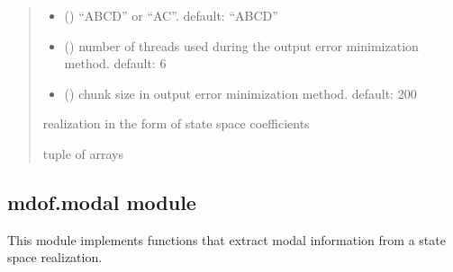 \documentclass[letterpaper,10pt,english]{sphinxmanual}
\begin{document}
\begin{fulllineitems}
\begin{quote}
\begin{description}
\begin{itemize}
\item {} 
\sphinxAtStartPar
{} (\sphinxstyleliteralemphasis{\sphinxupquote{, }}) \textendash{} “ABCD” or “AC”. default: “ABCD”

\item {} 
\sphinxAtStartPar
{} (\sphinxstyleliteralemphasis{\sphinxupquote{, }}) \textendash{} number of threads used during the output error minimization method.
default: 6

\item {} 
\sphinxAtStartPar
{} (\sphinxstyleliteralemphasis{\sphinxupquote{, }}) \textendash{} chunk size in output error minimization method. default: 200

\end{itemize}

\sphinxAtStartPar
realization in the form of state space coefficients 

\sphinxAtStartPar
tuple of arrays

\end{description}\end{quote}

\end{fulllineitems}


\sphinxstepscope


\subsection{mdof.modal module}
\label{\detokenize{library/mdof.modal:module-mdof.modal}}\label{\detokenize{library/mdof.modal:mdof-modal-module}}\label{\detokenize{library/mdof.modal::doc}}
\sphinxAtStartPar
This module implements functions that extract modal information
from a state space realization.
\end{document}
